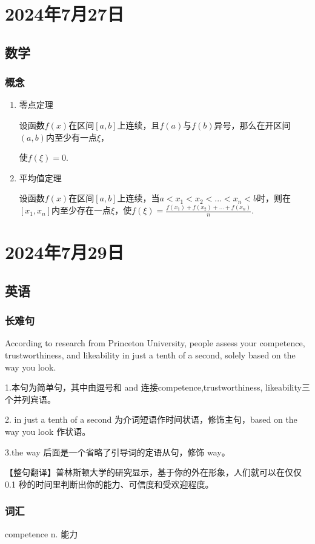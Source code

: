 \documentclass[UTF8]{ctexart}
\begin{document}
\section{2024年7月27日}
\subsection{数学}
\subsubsection{概念}
\begin{enumerate}
      \item 零点定理

            设函数$f(x)$在区间$[a,b]$上连续，且$f(a)$与$f(b)$异号，那么在开区间$(a,b)$内至少有一点$\xi$，

            使$f(\xi)=0$.
      \item 平均值定理

            设函数$f(x)$在区间$[a,b]$上连续，当$a<x_1<x_2<...<x_n<b$时，则在$[x_1,x_n]$内至少存在一点$\xi$，使$f(\xi)=\frac{f(x_1)+f(x_2)+...+f(x_n)}{n}$.
\end{enumerate}
\section{2024年7月29日}
\subsection{英语}
\subsubsection{长难句}
According to research from Princeton University, people assess your competence, trustworthiness, and likeability in just a tenth of a second, solely based on the way you look.

1.本句为简单句，其中由逗号和 and 连接competence,trustworthiness, likeability三个并列宾语。

2. in just a tenth of a second 为介词短语作时间状语，修饰主句，based on the way you look 作状语。

3.the way 后面是一个省略了引导词的定语从句，修饰 way。

【整句翻译】普林斯顿大学的研究显示，基于你的外在形象，人们就可以在仅仅 0.1 秒的时间里判断出你的能力、可信度和受欢迎程度。
\subsubsection{词汇}
competence n. 能力
\end{document}
